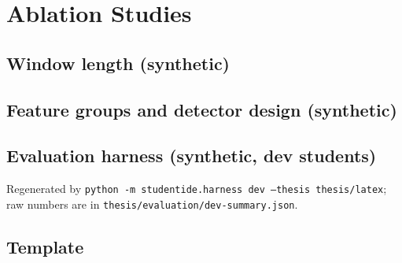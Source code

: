 \chapter{Ablation Studies}
\label{app:ablations}
%   

\section{Window length (synthetic)}


\section{Feature groups and detector design (synthetic)}


\section{Evaluation harness (synthetic, dev students)}
Regenerated by \texttt{python -m studentide.harness dev --thesis thesis/latex};
raw numbers are in \texttt{thesis/evaluation/dev-summary.json}.







\section{Template}

